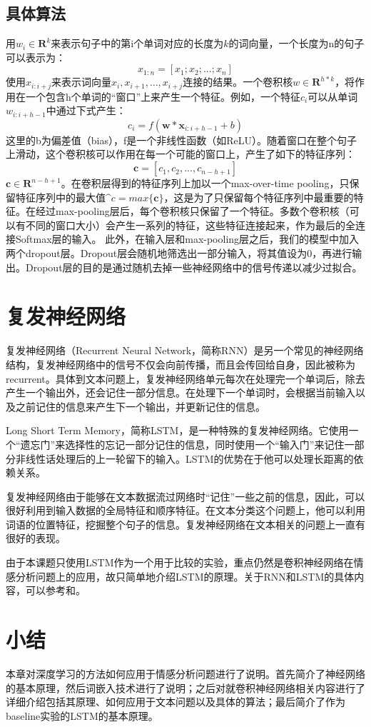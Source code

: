 \subsection{具体算法}
用$w_i\in \mathbf{R}^k$来表示句子中的第i个单词对应的长度为$k$的词向量，一个长度为n的句子可以表示为：
\begin{equation} \label{eq3.1}
x_{1:n} = [x_1; x_2;...; x_n]
\end{equation}
使用$x_{i:i+j}$来表示词向量$x_i, x_{i+1}, …, x_{i+j}$连接的结果。一个卷积核$w\in \mathbf{R}^{h*k}$，将作用在一个包含h个单词的“窗口”上来产生一个特征。例如，一个特征$c_i$可以从单词$w_{i:i+h-1}$中通过下式产生：
\begin{equation} \label{eq3.2}
c_i = f(\textbf{w}*\textbf{x}_{i:i+h-1} + b)
\end{equation}	
这里的b为偏差值（bias），f是一个非线性函数（如ReLU）。随着窗口在整个句子上滑动，这个卷积核可以作用在每一个可能的窗口上，产生了如下的特征序列：
\begin{equation} \label{eq3.3}
\textbf{c} = [c_1, c_2, ..., c_{n-h+1}]
\end{equation}	
$\textbf{c}\in\mathbf{R}^{n-h+1}$。在卷积层得到的特征序列上加以一个max-over-time pooling，只保留特征序列中的最大值$\^{c}=max\{\textbf{c}\}$，这是为了只保留每个特征序列中最重要的特征。在经过max-pooling层后，每个卷积核只保留了一个特征。多数个卷积核（可以有不同的窗口大小）会产生一系列的特征，这些特征连接起来，作为最后的全连接Softmax层的输入。
此外，在输入层和max-pooling层之后，我们的模型中加入两个dropout层。Dropout层会随机地筛选出一部分输入，将其值设为0，再进行输出。Dropout层的目的是通过随机去掉一些神经网络中的信号传递以减少过拟合。

\section{复发神经网络}
复发神经网络（Recurrent Neural Network，简称RNN）是另一个常见的神经网络结构，复发神经网络中的信号不仅会向前传播，而且会传回给自身，因此被称为recurrent。具体到文本问题上，复发神经网络单元每次在处理完一个单词后，除去产生一个输出外，还会记住一部分信息。在处理下一个单词时，会根据当前输入以及之前记住的信息来产生下一个输出，并更新记住的信息。

Long Short Term Memory，简称LSTM，是一种特殊的复发神经网络。它使用一个“遗忘门”来选择性的忘记一部分记住的信息，同时使用一个“输入门”来记住一部分非线性话处理后的上一轮留下的输入。LSTM的优势在于他可以处理长距离的依赖关系。

复发神经网络由于能够在文本数据流过网络时“记住”一些之前的信息，因此，可以很好利用到输入数据的全局特征和顺序特征。在文本分类这个问题上，他可以利用词语的位置特征，挖掘整个句子的信息。复发神经网络在文本相关的问题上一直有很好的表现。

由于本课题只使用LSTM作为一个用于比较的实验，重点仍然是卷积神经网络在情感分析问题上的应用，故只简单地介绍LSTM的原理。关于RNN和LSTM的具体内容，可以参考\cite{socher.2013.recursive}和\cite{sundermeyer2012lstm}。

\section{小结}
本章对深度学习的方法如何应用于情感分析问题进行了说明。首先简介了神经网络的基本原理，然后词嵌入技术进行了说明；之后对就卷积神经网络相关内容进行了详细介绍包括其原理、如何应用于文本问题以及具体的算法；最后简介了作为baseline实验的LSTM的基本原理。
